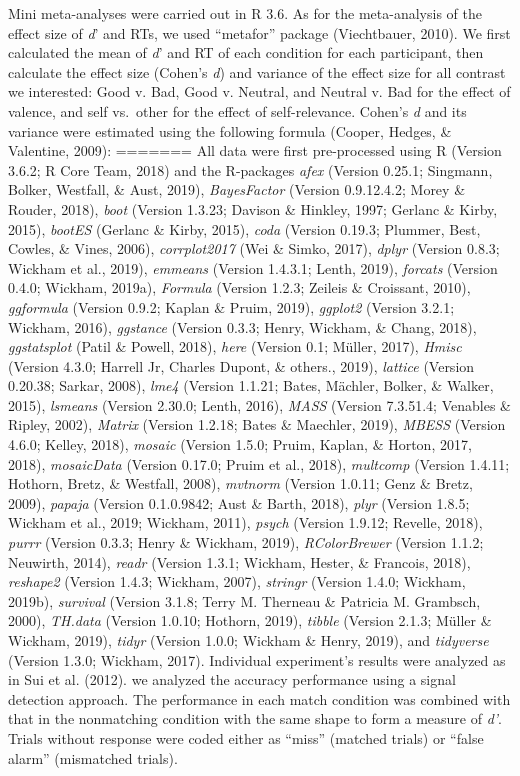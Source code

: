 \documentclass[
  man]{apa6}
\begin{document}
Mini meta-analyses were carried out in R 3.6. As for the meta-analysis of the effect size of \emph{d}' and RTs, we used \enquote{metafor} package (Viechtbauer, 2010). We first calculated the mean of \emph{d}' and RT of each condition for each participant, then calculate the effect size (Cohen's \emph{d}) and variance of the effect size for all contrast we interested: Good v. Bad, Good v. Neutral, and Neutral v. Bad for the effect of valence, and self vs.~other for the effect of self-relevance. Cohen's \emph{d} and its variance were estimated using the following formula (Cooper, Hedges, \& Valentine, 2009):
=======
All data were first pre-processed using R (Version 3.6.2; R Core Team, 2018) and the R-packages \emph{afex} (Version 0.25.1; Singmann, Bolker, Westfall, \& Aust, 2019), \emph{BayesFactor} (Version 0.9.12.4.2; Morey \& Rouder, 2018), \emph{boot} (Version 1.3.23; Davison \& Hinkley, 1997; Gerlanc \& Kirby, 2015), \emph{bootES} (Gerlanc \& Kirby, 2015), \emph{coda} (Version 0.19.3; Plummer, Best, Cowles, \& Vines, 2006), \emph{corrplot2017} (Wei \& Simko, 2017), \emph{dplyr} (Version 0.8.3; Wickham et al., 2019), \emph{emmeans} (Version 1.4.3.1; Lenth, 2019), \emph{forcats} (Version 0.4.0; Wickham, 2019a), \emph{Formula} (Version 1.2.3; Zeileis \& Croissant, 2010), \emph{ggformula} (Version 0.9.2; Kaplan \& Pruim, 2019), \emph{ggplot2} (Version 3.2.1; Wickham, 2016), \emph{ggstance} (Version 0.3.3; Henry, Wickham, \& Chang, 2018), \emph{ggstatsplot} (Patil \& Powell, 2018), \emph{here} (Version 0.1; Müller, 2017), \emph{Hmisc} (Version 4.3.0; Harrell Jr, Charles Dupont, \& others., 2019), \emph{lattice} (Version 0.20.38; Sarkar, 2008), \emph{lme4} (Version 1.1.21; Bates, Mächler, Bolker, \& Walker, 2015), \emph{lsmeans} (Version 2.30.0; Lenth, 2016), \emph{MASS} (Version 7.3.51.4; Venables \& Ripley, 2002), \emph{Matrix} (Version 1.2.18; Bates \& Maechler, 2019), \emph{MBESS} (Version 4.6.0; Kelley, 2018), \emph{mosaic} (Version 1.5.0; Pruim, Kaplan, \& Horton, 2017, 2018), \emph{mosaicData} (Version 0.17.0; Pruim et al., 2018), \emph{multcomp} (Version 1.4.11; Hothorn, Bretz, \& Westfall, 2008), \emph{mvtnorm} (Version 1.0.11; Genz \& Bretz, 2009), \emph{papaja} (Version 0.1.0.9842; Aust \& Barth, 2018), \emph{plyr} (Version 1.8.5; Wickham et al., 2019; Wickham, 2011), \emph{psych} (Version 1.9.12; Revelle, 2018), \emph{purrr} (Version 0.3.3; Henry \& Wickham, 2019), \emph{RColorBrewer} (Version 1.1.2; Neuwirth, 2014), \emph{readr} (Version 1.3.1; Wickham, Hester, \& Francois, 2018), \emph{reshape2} (Version 1.4.3; Wickham, 2007), \emph{stringr} (Version 1.4.0; Wickham, 2019b), \emph{survival} (Version 3.1.8; Terry M. Therneau \& Patricia M. Grambsch, 2000), \emph{TH.data} (Version 1.0.10; Hothorn, 2019), \emph{tibble} (Version 2.1.3; Müller \& Wickham, 2019), \emph{tidyr} (Version 1.0.0; Wickham \& Henry, 2019), and \emph{tidyverse} (Version 1.3.0; Wickham, 2017). Individual experiment's results were analyzed as in Sui et al. (2012). we analyzed the accuracy performance using a signal detection approach. The performance in each match condition was combined with that in the nonmatching condition with the same shape to form a measure of \emph{d'}. Trials without response were coded either as \enquote{miss} (matched trials) or \enquote{false alarm} (mismatched trials). 
\end{document}
